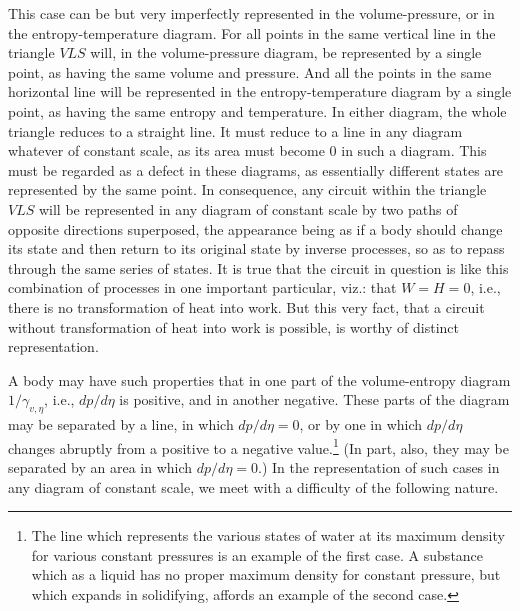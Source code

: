 \documentclass[11pt]{article}
\begin{document}
This case can be but very imperfectly represented in the volume-pressure, or in the entropy-temperature diagram. For all points in the same vertical line in the triangle $VLS$ will, in the volume-pressure diagram, be represented by a single point, as having the same volume and pressure. And all the points in the same horizontal line will be represented in the entropy-temperature diagram by a single point, as having the same entropy and temperature. In either diagram, the whole triangle reduces to a straight line. It must reduce to a line in any diagram whatever of constant scale, as its area must become 0 in such a diagram. This must be regarded as a defect in these diagrams, as essentially different states are represented by the same point. In consequence, any circuit within the triangle $VLS$ will be represented in any diagram of constant scale by two paths of opposite directions superposed, the appearance being as if a body should change its state and then return to its original state by inverse processes, so as to repass through the same series of states. It is true that the circuit in question is like this combination of processes in one important particular, viz.: that $W=H=0$, i.e., there is no transformation of heat into work. But this very fact, that a circuit without transformation of heat into work is possible, is worthy of distinct representation.

A body may have such properties that in one part of the volume-entropy diagram $1/\gamma_{v,\eta}$, i.e., $dp/d\eta$ is positive, and in another negative. These parts of the diagram may be separated by a line, in which $dp/d\eta=0$, or by one in which $dp/d\eta$ changes abruptly from a positive to a negative value.\footnote{The line which represents the various states of water at its maximum density for various constant pressures is an example of the first case. A substance which as a liquid has no proper maximum density for constant pressure, but which expands in solidifying, affords an example of the second case.} (In part, also, they may be separated by an area in which $dp/d\eta=0$.) In the representation of such cases in any diagram of constant scale, we meet with a difficulty of the following nature.
\end{document}
